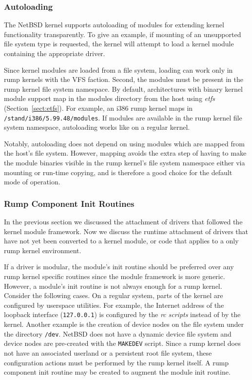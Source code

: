 \subsubsection*{Autoloading}

The NetBSD kernel supports autoloading of modules for extending kernel
functionality transparently.  To give an example, if mounting of
an unsupported file system type is requested, the kernel will
attempt to load a kernel module containing the appropriate driver.

Since kernel modules are loaded from a file system, loading can work
only in rump kernels with the VFS faction.  Second, the modules
must be present in the rump kernel file system namespace.  By
default, architectures with binary kernel module support map in
the modules directory from the host using \textit{etfs}
(Section~\ref{sect:etfs}).  For example, an i386 rump kernel maps in
\texttt{/stand/i386/5.99.48/modules}.  If modules are available in
the rump kernel file system namespace, autoloading works like on
a regular kernel.

Notably, autoloading does not depend on using modules which are
mapped from the host's file system.  However, mapping avoids the
extra step of having to make the module binaries visible in the
rump kernel's file system namespace either via mounting or run-time
copying, and is therefore a good choice for the default mode of
operation.

\subsubsection{Rump Component Init Routines}

In the previous section we discussed the attachment of drivers that
followed the kernel module framework.  Now we discuss the runtime
attachment of drivers that have not yet been converted to a kernel
module, or code that applies to a only rump kernel environment.

If a driver is modular, the module's init routine should be preferred
over any rump kernel specific routines since the module framework is more generic.
However, a module's init routine is not always enough for a rump
kernel.  Consider the following cases.  On a regular system, parts of
the kernel are configured by userspace utilities.  For example,
the Internet address of the loopback interface (\texttt{127.0.0.1}) is configured by the
\textit{rc scripts} instead of by the kernel.  Another example is the creation
of device nodes on the file system under the directory \texttt{/dev}.  NetBSD does
not have a dynamic device file system and device nodes are pre-created
with the \texttt{MAKEDEV} script.  Since a rump kernel does not
have an associated userland or a persistent root file system, these
configuration actions must be performed by the rump kernel itself.
A rump component init routine may be created to augment the
module init routine.

